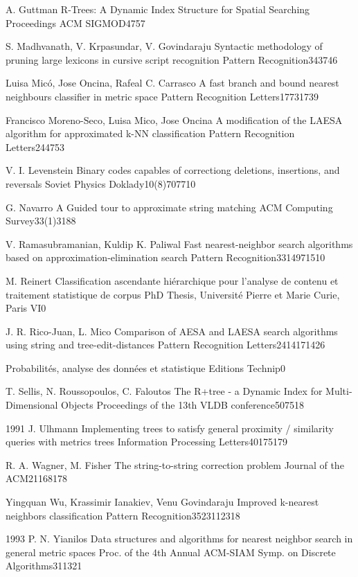  {A. Guttman}
{R-Trees: A Dynamic Index Structure for Spatial Searching}
{Proceedings ACM SIGMOD}{}{47}{57}

 {S. Madhvanath, V. Krpasundar, V. Govindaraju}
{Syntactic methodology of pruning large lexicons in cursive script recognition}
{Pattern Recognition}{34}{37}{46}

 {Luisa Mic\'o, Jose Oncina, Rafeal C. Carrasco}
{A fast branch and bound nearest neighbours classifier in metric space}
{Pattern Recognition Letters}{17}{731}{739}

 {Francisco Moreno-Seco, Luisa Mico, Jose Oncina}
{A modification of the LAESA algorithm for approximated k-NN classification}
{Pattern Recognition Letters}{24}{47}{53}

 {V. I. Levenstein}
{Binary codes capables of correctiong deletions, insertions, and reversals}
{Soviet Physics Doklady}{10(8)}{707}{710}

 {G. Navarro}
{A Guided tour to approximate string matching}
{ACM Computing Survey}{33(1)}{31}{88}

 {V. Ramasubramanian, Kuldip K. Paliwal}
{Fast nearest-neighbor search algorithms based on approximation-elimination search}
{Pattern Recognition}{33}{1497}{1510}

 {M.  Reinert}
{Classification ascendante hi\'erarchique pour l'analyse de contenu et traitement statistique de corpus}
{PhD Thesis, Universit\'e Pierre et Marie Curie, Paris VI}{}{0}{}

  {J. R. Rico-Juan,  L. Mico}
{Comparison of AESA and LAESA search algorithms using string and tree-edit-distances}
{Pattern Recognition Letters}{24}{1417}{1426}

{Probabilit\'es, analyse des donn\'ees et statistique}
{Editions Technip}{}{0}{}

 {T. Sellis, N. Roussopoulos, C. Faloutos}
{The R+tree - a Dynamic Index for Multi-Dimensional Objects}
{Proceedings of the 13th VLDB conference}{}{507}{518}

 {1991} {J. Ulhmann}
{Implementing trees to satisfy general proximity / similarity queries with metrics trees}
{Information Processing Letters}{40}{175}{179}

 {R. A. Wagner, M. Fisher}
{The string-to-string correction problem}
{Journal of the ACM}{21}{168}{178}

 {Yingquan Wu, Krassimir Ianakiev, Venu Govindaraju}
{Improved k-nearest neighbors classification}
{Pattern Recognition}{35}{2311}{2318}

 {1993} {P. N. Yianilos}
{Data structures and algorithms for nearest neighbor search in general metric spaces}
{Proc. of the 4th Annual ACM-SIAM Symp. on Discrete Algorithms}{311}{321}

